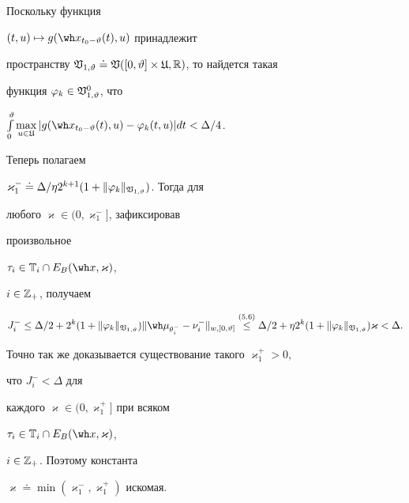 \begin{pf}


Поскольку функция


$(t,u)\mapsto g(\wh x_{t_0-\vartheta }(t),u)$ принадлежит


пространству $\frak V_{1,\vartheta}\doteq\frak V([0,\vartheta]


\times\frak U,\bR)$, то найдется такая


функция $\varphi_k\in\frak V_{1,\vartheta}^0$, что


$\int\limits_0^\vartheta\max\limits_{u\in\frak U}


|g(\wh x_{t_0-\vartheta}(t),u)-\varphi_k(t,u)|dt<\Delta/4$.


Теперь полагаем


$\varkappa_1^-\doteq\Delta/\eta 2^{k+1}(1+\|\varphi_k


\|_{\frak V_{1,\vartheta}})$. Тогда для


любого ${\varkappa}\in(0,\varkappa_1^-]$, зафиксировав


произвольное


$\tau_i\in\bT_i\cap E_{B}(\wh x,{\varkappa})$,


$i\in\Bbb Z_+$, получаем


$$


J_i^-\le\Delta/2+2^k(1+\|\varphi_k


\|_{\frak V_{1,\vartheta}})


\|\wh\mu_{\theta_i^-}-\nu_i^-\|_{w,[0,\vartheta]}


\up{(5.6)}{\le}


\Delta/2+\eta2^k(1+\|\varphi_k\|_{\frak V_{1,\vartheta }})


{\varkappa}<\Delta.


$$





Точно так же доказывается существование такого ${\varkappa}_{1}^{+}>0$,


что $J_{i}^{-}<\Delta$ для


каждого $\varkappa\in(0,\varkappa_1^+]$ при всяком


$\tau_i\in\bT_i\cap E_B(\wh x,\varkappa)$,


$i\in\Bbb Z_+$. Поэтому константа


$\varkappa\doteq\min(\varkappa_1^-,\varkappa_1^+)$ искомая.


\end{pf}





